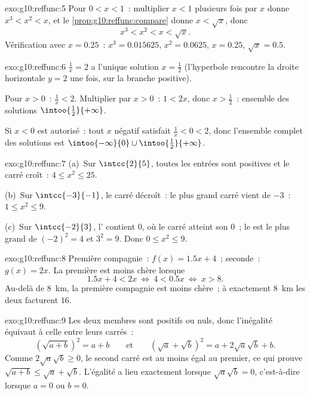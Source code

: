 \begin{solution}{exo:g10:reffunc:5}
Pour $0 < x < 1$~: multiplier $x < 1$ plusieurs fois par $x$ donne
$x^3 < x^2 < x$, et le \cref{prop:g10:reffunc:compare} donne
$x < \sqrt x$, donc
\[
x^3 < x^2 < x < \sqrt x .
\]
Vérification avec $x = 0.25$~: $x^3 = 0.015625$, $x^2 = 0.0625$,
$x = 0.25$, $\sqrt x = 0.5$.
\end{solution}

\begin{solution}{exo:g10:reffunc:6}
$\frac1x = 2$ a l'unique solution $x = \frac12$ (l'hyperbole rencontre
la droite horizontale $y = 2$ une fois, sur la branche positive).

Pour $x > 0$~: $\frac1x < 2$. Multiplier par $x > 0$~: $1 < 2x$, donc
$x > \frac12$~: ensemble des solutions $\intoo{\frac12}{+\infty}$.

Si $x < 0$ est autorisé~: tout $x$ négatif satisfait
$\frac1x < 0 < 2$, donc l'ensemble complet des solutions est
$\intoo{-\infty}{0} \cup \intoo{\frac12}{+\infty}$.
\end{solution}

\begin{solution}{exo:g10:reffunc:7}
(a)~Sur $\intcc{2}{5}$, toutes les entrées sont positives et le carré
croît~: $4 \leq x^2 \leq 25$.

(b)~Sur $\intcc{-3}{-1}$, le carré décroît~: le plus grand carré vient
de $-3$~: $1 \leq x^2 \leq 9$.

(c)~Sur $\intcc{-2}{3}$, l' contient $0$, où le carré atteint
son  $0$~; le  est le plus grand de $(-2)^2 = 4$ et
$3^2 = 9$. Donc $0 \leq x^2 \leq 9$.
\end{solution}

\begin{solution}{exo:g10:reffunc:8}
Première compagnie~: $f(x) = 1.5x + 4$~; seconde~: $g(x) = 2x$. La
première est moins chère lorsque
\[
1.5x + 4 < 2x
\ \Longleftrightarrow\
4 < 0.5x
\ \Longleftrightarrow\
x > 8 .
\]
Au-delà de $8$~km, la première compagnie est moins chère~; à exactement
$8$~km les deux facturent $16$.
\end{solution}

\begin{solution}{exo:g10:reffunc:9}
Les deux membres sont positifs ou nuls, donc l'inégalité équivaut à
celle entre leurs carrés~:
\[
\left(\sqrt{a+b}\right)^2 = a + b
\qquad\text{et}\qquad
\left(\sqrt a + \sqrt b\right)^2 = a + 2\sqrt a \sqrt b + b .
\]
Comme $2\sqrt a\sqrt b \geq 0$, le second carré est au moins égal au
premier, ce qui prouve $\sqrt{a+b} \leq \sqrt a + \sqrt b$. L'égalité a
lieu exactement lorsque $\sqrt a \sqrt b = 0$, c'est-à-dire lorsque
$a = 0$ ou $b = 0$.
\end{solution}

